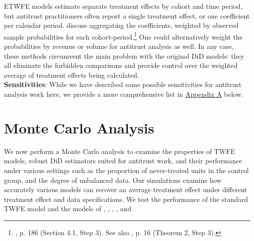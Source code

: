 \documentclass[12pt]{article}
\begin{document}
ETWFE models estimate separate treatment effects by cohort and time period, but antitrust practitioners often report a single treatment effect, or one coefficient per calendar period. \citet{sunabr2021a} discuss aggregating the coefficients, weighted by observed sample probabilities for each cohort-period.\footnote{\citet{sunabr2021a}, p. 186 (Section 4.1, Step 3). See also \citet{borusyak2024revisiting}, p. 16 (Theorem 2, Step 3).} One could alternatively weight the probabilities by revenue or volume for antitrust analysis as well. In any case, these methods circumvent the main problem with the original DiD models: they all eliminate the forbidden comparisons and provide control over the weighted average of treatment effects being calculated.
\\
\textbf{Sensitivities}: While we have described some possible sensitivities for antitrust analysis work here, we provide a more comprehensive list in  \hyperref[sec:appendixa]{Appendix A} below.
\section{Monte Carlo Analysis} \label{sec:analysis}
We now perform a Monte Carlo analysis to examine the properties of TWFE models, robust DiD estimators suited for antitrust work, and their performance under various settings such as the proportion of never-treated units in the control group, and the degree of unbalanced data. Our simulations examine how accurately various models can recover an average treatment effect under different treatment effect and data specifications. We test the performance of the standard TWFE model and the models of \citet{sunabr2021a}, \citet{wooldridge2021two}, \citet{borusyak2024revisiting}, \citet{gardner2022a}, and \citet{CS2021}.
\end{document}
